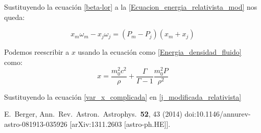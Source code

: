 \documentclass[12pt,a4paper]{book}
\begin{document}
Sustituyendo la ecuación \ref{beta-lor} a la \ref{Ecuacion_energia_relativista_mod} nos queda:

\begin{equation} \label{Choque adiabatico}
x_m \omega_m- x_j \omega_j = \left( P_m-P_j \right) \left( x_m+x_j \right) 
\end{equation}

Podemos reescribir a $x$ usando la ecuación  como \ref{Energia_densidad_fluido} como:
\begin{equation} \label{var_x_complicada}
x= \frac{m_0^2 c^2}{\rho}+ \frac{\Gamma}{\Gamma-1}\frac{m_0^2 P}{\rho^2}
\end{equation}

Sustituyendo la ecuación \ref{var_x_complicada} en \ref{j_modificada_relativista}


\begin{thebibliography}{20}


  E.~Berger,
  Ann.\ Rev.\ Astron.\ Astrophys.\  {\bf 52}, 43 (2014)
  doi:10.1146/annurev-astro-081913-035926
  [arXiv:1311.2603 [astro-ph.HE]].
 

 
\end{thebibliography}
\end{document}
